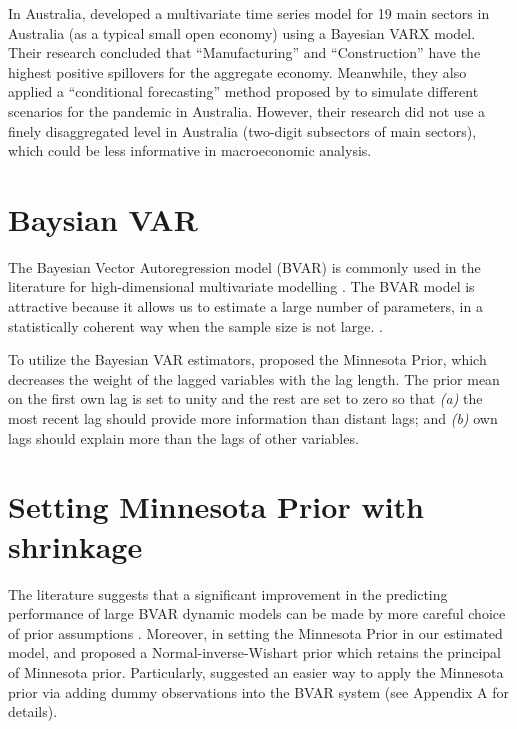 \documentclass{monashthesis}
\begin{document}
In Australia, \textcite{anderson2020} developed a multivariate time series model for 19 main sectors in Australia (as a typical small open economy) using a Bayesian VARX model. Their research concluded that ``Manufacturing'' and ``Construction'' have the highest positive spillovers for the aggregate economy. Meanwhile, they also applied a ``conditional forecasting'' method proposed by \textcite{waggoner1999} to simulate different scenarios for the pandemic in Australia. However, their research did not use a finely disaggregated level in Australia (two-digit subsectors of main sectors), which could be less informative in macroeconomic analysis.

\hypertarget{baysian-var}{%
\section{Baysian VAR}\label{baysian-var}}

The Bayesian Vector Autoregression model (BVAR) is commonly used in the literature for high-dimensional multivariate modelling \autocites[e.g.][]{anderson2020,litterman1986,banbura2010large}. The BVAR model is attractive because it allows us to estimate a large number of parameters, in a statistically coherent way when the sample size is not large. \autocite{litterman1986,wozniak2016bayesian}.

To utilize the Bayesian VAR estimators, \textcite{litterman1979} proposed the Minnesota Prior, which decreases the weight of the lagged variables with the lag length. The prior mean on the first own lag is set to unity and the rest are set to zero so that \emph{(a)} the most recent lag should provide more information than distant lags; and \emph{(b)} own lags should explain more than the lags of other variables.

\hypertarget{setting-minnesota-prior-with-shrinkage}{%
\section{Setting Minnesota Prior with shrinkage}\label{setting-minnesota-prior-with-shrinkage}}

The literature suggests that a significant improvement in the predicting performance of large BVAR dynamic models can be made by more careful choice of prior assumptions \autocite{banbura2010large,litterman1986}. Moreover, in setting the Minnesota Prior in our estimated model, \textcite{robertson1999vector} and \textcite{kadiyala1997} proposed a Normal-inverse-Wishart prior which retains the principal of Minnesota prior. Particularly, \textcite{banbura2010large} suggested an easier way to apply the Minnesota prior via adding dummy observations into the BVAR system (see Appendix A for details).
\end{document}
